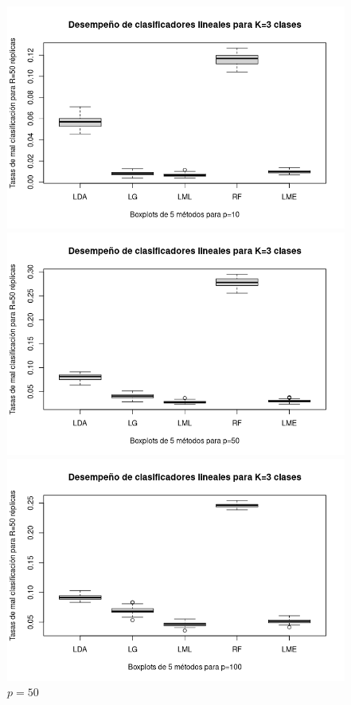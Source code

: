 \documentclass{report}
\begin{document}
  
  \begin{figure} [h]
  	\begin{multicols}{2}
  		\includegraphics[width=\linewidth]{3_clases_p10_sigma_I}\par 
  		\caption*{$p=10$}
  		\includegraphics[width=\linewidth]{3_clases_p50_sigma_I}\par 
  		\caption*{$p=50$}	 
  	\end{multicols}
  	\begin{multicols}{2}
  		\includegraphics[width=\linewidth]{3_clases_p100_sigma_I}\par

\end{multicols}
\end{figure}
\end{document}
